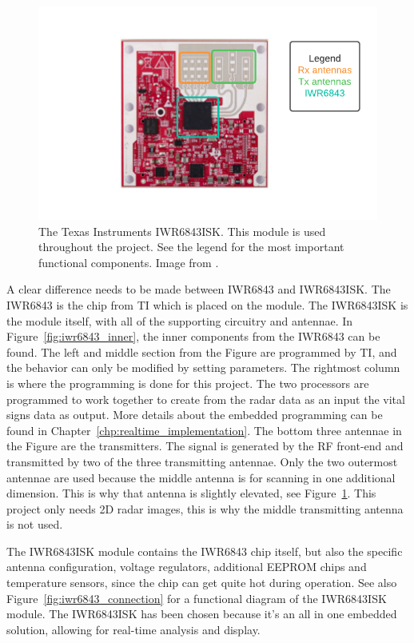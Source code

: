 \begin{figure}[t]
\centering
\includegraphics[width=.8\textwidth]{figures/background/IWR6843 legend.pdf}
\caption{The Texas Instruments IWR6843ISK. This module is used throughout the project. See the legend for the most important functional components. Image from \cite{iwr6843isk_website}.}
\label{fig:iwr6843isk}
\end{figure}

A clear difference needs to be made between IWR6843 and IWR6843ISK. The IWR6843 is the chip from TI which is placed on the module. The IWR6843ISK is the module itself, with all of the supporting circuitry and antennae. In Figure~\ref{fig:iwr6843_inner}, the inner components from the IWR6843 can be found. The left and middle section from the Figure are programmed by TI, and the behavior can only be modified by setting parameters. The rightmost column is where the programming is done for this project. The two processors are programmed to work together to create from the radar data as an input the vital signs data as output. More details about the embedded programming can be found in Chapter~\ref{chp:realtime_implementation}. The bottom three antennae in the Figure are the transmitters. The signal is generated by the RF front-end and transmitted by two of the three transmitting antennae. Only the two outermost antennae are used because the middle antenna is for scanning in one additional dimension. This is why that antenna is slightly elevated, see Figure~\ref{fig:iwr6843isk}. This project only needs 2D radar images, this is why the middle transmitting antenna is not used.

The IWR6843ISK module contains the IWR6843 chip itself, but also the specific antenna configuration, voltage regulators, additional EEPROM chips and temperature sensors, since the chip can get quite hot during operation. See also Figure~\ref{fig:iwr6843_connection} for a functional diagram of the IWR6843ISK module. The IWR6843ISK has been chosen because it's an all in one embedded solution, allowing for real-time analysis and display. 

